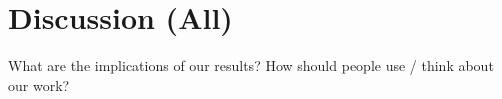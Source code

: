 \section{Discussion (All)}

What are the implications of our results? How should people use / think about our work?